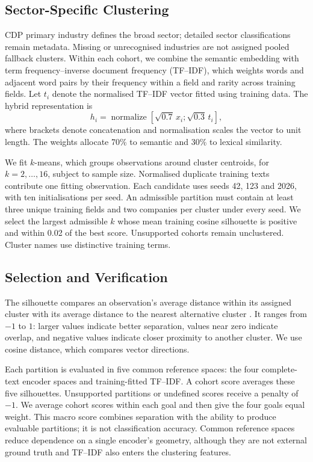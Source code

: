 \documentclass[12pt]{article}
\begin{document}
\subsection{Sector-Specific Clustering}
CDP primary industry defines the broad sector; detailed sector classifications remain metadata. Missing or unrecognised industries are not assigned pooled fallback clusters. Within each cohort, we combine the semantic embedding with term frequency--inverse document frequency (TF--IDF), which weights words and adjacent word pairs by their frequency within a field and rarity across training fields. Let $t_i$ denote the normalised TF--IDF vector fitted using training data. The hybrid representation is
\begin{equation}
h_i=\operatorname{normalize}\left[\sqrt{0.7}\,x_i;\sqrt{0.3}\,t_i\right],
\label{eq:hybrid_embedding}
\end{equation}
where brackets denote concatenation and normalisation scales the vector to unit length. The weights allocate 70\% to semantic and 30\% to lexical similarity.

We fit $k$-means, which groups observations around cluster centroids, for $k=2,\ldots,16$, subject to sample size. Normalised duplicate training texts contribute one fitting observation. Each candidate uses seeds 42, 123 and 2026, with ten initialisations per seed. An admissible partition must contain at least three unique training fields and two companies per cluster under every seed. We select the largest admissible $k$ whose mean training cosine silhouette is positive and within 0.02 of the best score. Unsupported cohorts remain unclustered. Cluster names use distinctive training terms.

\subsection{Selection and Verification}
The silhouette compares an observation's average distance within its assigned cluster with its average distance to the nearest alternative cluster \cite{silhouette}. It ranges from $-1$ to $1$: larger values indicate better separation, values near zero indicate overlap, and negative values indicate closer proximity to another cluster. We use cosine distance, which compares vector directions.

Each partition is evaluated in five common reference spaces: the four complete-text encoder spaces and training-fitted TF--IDF. A cohort score averages these five silhouettes. Unsupported partitions or undefined scores receive a penalty of $-1$. We average cohort scores within each goal and then give the four goals equal weight. This macro score combines separation with the ability to produce evaluable partitions; it is not classification accuracy. Common reference spaces reduce dependence on a single encoder's geometry, although they are not external ground truth and TF--IDF also enters the clustering features.
\end{document}
